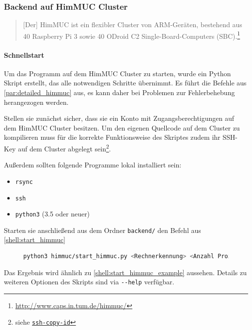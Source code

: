 \subsubsection{Backend auf HimMUC Cluster}

\begin{quotation}
	[Der] HimMUC ist ein flexibler Cluster von ARM-Geräten, bestehend aus 40 Raspberry Pi 3 sowie 40 ODroid C2 Single-Board-Computers (SBC).\footnote{\url{http://www.caps.in.tum.de/himmuc/}}
\end{quotation}

\paragraph{Schnellstart}

Um das Programm auf dem HimMUC Cluster zu starten, wurde ein
Python Skript erstellt, das alle notwendigen Schritte übernimmt.
Es führt die Befehle aus \autoref{par:detailed_himmuc} aus, es kann daher bei Problemen zur Fehlerbehebung herangezogen werden.

Stellen sie zunächst sicher, dass sie ein Konto mit Zugangsberechtigungen auf dem HimMUC Cluster besitzen.
Um den eigenen Quellcode auf dem Cluster zu kompilieren muss für die korrekte Funktionsweise des Skriptes zudem
ihr SSH-Key auf dem Cluster abgelegt sein\footnote{siehe \href{https://www.ssh.com/ssh/copy-id}{\texttt{ssh-copy-id}}}.

Außerdem sollten folgende Programme lokal installiert sein:
\begin{itemize}
	\item \verb|rsync|
	\item \verb|ssh|
	\item \verb|python3| (3.5 oder neuer)
\end{itemize}

Starten sie anschließend aus dem Ordner \verb|backend/| den Befehl aus \autoref{shell:start_himmuc}

\begin{figure}[h!]
	\begin{lstlisting}[language=bash, caption={Start der Entwicklungsumbegung auf dem HimMUC}, label={shell:start_himmuc}]
python3 himmuc/start_himmuc.py <Rechnerkennung> <Anzahl Prozesse> <Anzahl Rechenknoten> 
    \end{lstlisting}
\end{figure}

Das Ergebnis wird ähnlich zu \autoref{shell:start_himmuc_example} aussehen.
Details zu weiteren Optionen des Skripts sind via \verb|--help| verfügbar.

